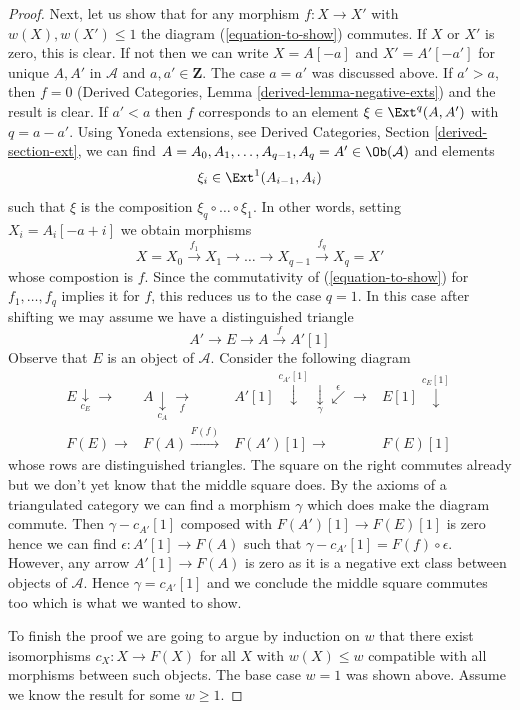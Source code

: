 \begin{proof}
\medskip\noindent
Next, let us show that for any morphism $f : X \to X'$  with
$w(X), w(X') \leq 1$ the diagram (\ref{equation-to-show}) commutes.
If $X$ or $X'$ is zero, this is clear. If not then we can write
$X = A[-a]$ and $X' = A'[-a']$ for unique $A, A'$ in $\mathcal{A}$
and $a, a' \in \mathbf{Z}$. The case $a = a'$ was discussed above.
If $a' > a$, then $f = 0$ (Derived Categories, Lemma
\ref{derived-lemma-negative-exts}) and the result is clear.
If $a' < a$ then $f$ corresponds to an element
$\xi \in \Ext^q(A, A')$ with $q = a - a'$. Using Yoneda extensions, see
Derived Categories, Section \ref{derived-section-ext}, we can find
$A = A_0, A_1, \ldots, A_{q - 1}, A_q = A' \in \Ob(\mathcal{A})$ and
elements
$$
\xi_i \in \Ext^1(A_{i - 1}, A_i)
$$
such that $\xi$ is the composition $\xi_q \circ \ldots \circ \xi_1$.
In other words, setting $X_i = A_i[-a + i]$
we obtain morphisms
$$
X = X_0 \xrightarrow{f_1} X_1 \to \ldots \to X_{q - 1}
\xrightarrow{f_q} X_q = X'
$$
whose compostion is $f$. Since the commutativity of  (\ref{equation-to-show})
for $f_1, \ldots, f_q$ implies it for $f$, this reduces us to the case $q = 1$.
In this case after shifting we may assume we have a distinguished triangle
$$
A' \to E \to A \xrightarrow{f} A'[1]
$$
Observe that $E$ is an object of $\mathcal{A}$. Consider the following
diagram
$$
\begin{array}{cccc}E \underset{c_E}{\downarrow}\longrightarrow & A \underset{c_A}{\downarrow}\underset{f}{\longrightarrow} & A'[1] \overset{c_{A'}[1]}{\downarrow}\underset{\gamma}{\downarrow}\overset{\epsilon}{\swarrow}\longrightarrow & E[1] \overset{c_E[1]}{\downarrow} \\ F(E) \longrightarrow & F(A) \overset{F(f)}{\longrightarrow} & F(A')[1] \longrightarrow & F(E)[1]\end{array}
$$
whose rows are distinguished triangles.
The square on the right commutes already but we don't yet know that
the middle square does. By the axioms of a triangulated category
we can find a morphism $\gamma$ which does make the diagram commute.
Then $\gamma - c_{A'}[1]$ composed with
$F(A')[1] \to F(E)[1]$ is zero hence we
can find $\epsilon : A'[1] \to F(A)$ such that
$\gamma - c_{A'}[1] = F(f) \circ \epsilon$. However, any arrow
$A'[1] \to F(A)$ is zero as it is a negative ext class
between objects of $\mathcal{A}$. Hence $\gamma = c_{A'}[1]$
and we conclude the middle square commutes too which is what we
wanted to show.

\medskip\noindent
To finish the proof we are going to argue by induction on $w$
that there exist isomorphisms $c_X : X \to F(X)$ for all
$X$ with $w(X) \leq w$ compatible with all morphisms between
such objects. The base case $w = 1$ was shown above. Assume
we know the result for some $w \geq 1$.


\end{proof}
